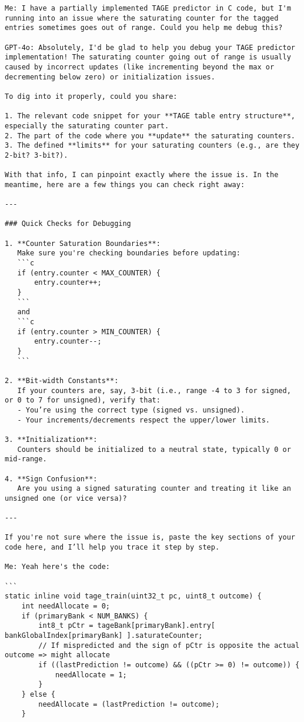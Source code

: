 \documentclass[sigconf, screen]{acmart}
\begin{document}
\begin{Verbatim}[fontsize=\tiny, breaklines=true]
Me: I have a partially implemented TAGE predictor in C code, but I'm running into an issue where the saturating counter for the tagged entries sometimes goes out of range. Could you help me debug this?

GPT-4o: Absolutely, I'd be glad to help you debug your TAGE predictor implementation! The saturating counter going out of range is usually caused by incorrect updates (like incrementing beyond the max or decrementing below zero) or initialization issues.

To dig into it properly, could you share:

1. The relevant code snippet for your **TAGE table entry structure**, especially the saturating counter part.
2. The part of the code where you **update** the saturating counters.
3. The defined **limits** for your saturating counters (e.g., are they 2-bit? 3-bit?).

With that info, I can pinpoint exactly where the issue is. In the meantime, here are a few things you can check right away:

---

### Quick Checks for Debugging

1. **Counter Saturation Boundaries**:
   Make sure you're checking boundaries before updating:
   ```c
   if (entry.counter < MAX_COUNTER) {
       entry.counter++;
   }
   ```
   and
   ```c
   if (entry.counter > MIN_COUNTER) {
       entry.counter--;
   }
   ```

2. **Bit-width Constants**:
   If your counters are, say, 3-bit (i.e., range -4 to 3 for signed, or 0 to 7 for unsigned), verify that:
   - You’re using the correct type (signed vs. unsigned).
   - Your increments/decrements respect the upper/lower limits.

3. **Initialization**:
   Counters should be initialized to a neutral state, typically 0 or mid-range.

4. **Sign Confusion**:
   Are you using a signed saturating counter and treating it like an unsigned one (or vice versa)?

---

If you're not sure where the issue is, paste the key sections of your code here, and I’ll help you trace it step by step.

Me: Yeah here's the code:

```
static inline void tage_train(uint32_t pc, uint8_t outcome) {
    int needAllocate = 0;
    if (primaryBank < NUM_BANKS) {
        int8_t pCtr = tageBank[primaryBank].entry[ bankGlobalIndex[primaryBank] ].saturateCounter;
        // If mispredicted and the sign of pCtr is opposite the actual outcome => might allocate
        if ((lastPrediction != outcome) && ((pCtr >= 0) != outcome)) {
            needAllocate = 1;
        }
    } else {
        needAllocate = (lastPrediction != outcome);
    }


\end{Verbatim}
\end{document}

